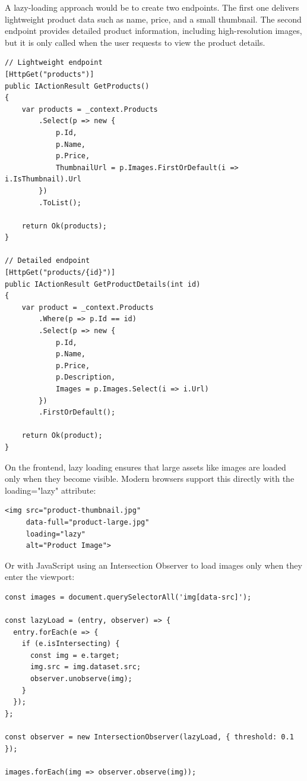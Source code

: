 A lazy-loading approach would be to create two endpoints. The first one delivers lightweight product data such as name, price, and a small thumbnail. The second endpoint provides detailed product information, including high-resolution images, but it is only called when the user requests to view the product details.

\begin{lstlisting}
// Lightweight endpoint
[HttpGet("products")]
public IActionResult GetProducts()
{
    var products = _context.Products
        .Select(p => new {
            p.Id,
            p.Name,
            p.Price,
            ThumbnailUrl = p.Images.FirstOrDefault(i => i.IsThumbnail).Url
        })
        .ToList();

    return Ok(products);
}

// Detailed endpoint
[HttpGet("products/{id}")]
public IActionResult GetProductDetails(int id)
{
    var product = _context.Products
        .Where(p => p.Id == id)
        .Select(p => new {
            p.Id,
            p.Name,
            p.Price,
            p.Description,
            Images = p.Images.Select(i => i.Url)
        })
        .FirstOrDefault();

    return Ok(product);
}

\end{lstlisting}

On the frontend, lazy loading ensures that large assets like images are loaded only when they become visible. Modern browsers support this directly with the loading="lazy" attribute:

\begin{lstlisting}
<img src="product-thumbnail.jpg"
     data-full="product-large.jpg"
     loading="lazy"
     alt="Product Image">

\end{lstlisting}

Or with JavaScript using an Intersection Observer to load images only when they enter the viewport:

\begin{lstlisting}
const images = document.querySelectorAll('img[data-src]');

const lazyLoad = (entry, observer) => {
  entry.forEach(e => {
    if (e.isIntersecting) {
      const img = e.target;
      img.src = img.dataset.src;
      observer.unobserve(img);
    }
  });
};

const observer = new IntersectionObserver(lazyLoad, { threshold: 0.1 });

images.forEach(img => observer.observe(img));

\end{lstlisting}


